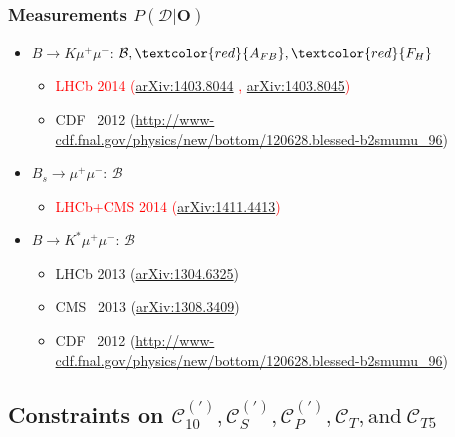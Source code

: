 \documentclass[english]{beamer}
\newcommand{\slide}[2][t]{\begin{frame}[#1] \frametitle{\insertsection} #2 \end{frame}}
\newcommand{\red}[1]{\textcolor{red}{#1}}
\begin{document}
\slide[c]{

    \frametitle{Measurements $ P\left(\mathcal{D} | \boldsymbol{O} \right) $}

    \begin{itemize}
        \item $B\rightarrow K\mu^+\mu^-$: $\mathcal{B} , \red{A_{FB}} , \red{F_H}$
        \begin{itemize}
            \item \red{LHCb 2014 {\tiny (\href{http://arXiv.org/abs/1403.8044}{arXiv:1403.8044} , \href{http://arXiv.org/abs/1403.8045}{arXiv:1403.8045})}}
            \item CDF~ 2012 {\tiny (\url{http://www-cdf.fnal.gov/physics/new/bottom/120628.blessed-b2smumu_96})}
        \end{itemize}

        \item $B_s\rightarrow\mu^+\mu^-$: $\mathcal{B}$

        \begin{itemize}
            \item \red{LHCb+CMS 2014 {\tiny({\href{http://arXiv.org/abs/1411.4413}{arXiv:1411.4413}})}}
        \end{itemize}

        \item $B\rightarrow K^\ast\mu^+\mu^-$: $\mathcal{B}$

        \begin{itemize}
            \item LHCb 2013 {\tiny({\href{http://arXiv.org/abs/1304.6325}{arXiv:1304.6325}})}
            \item CMS~ 2013 {\tiny({\href{http://arXiv.org/abs/1308.3409}{arXiv:1308.3409}})}
            \item CDF~ 2012 {\tiny (\url{http://www-cdf.fnal.gov/physics/new/bottom/120628.blessed-b2smumu_96})}
        \end{itemize}
    \end{itemize}

}

\subsection{Constraints on $\mathcal{C}_{10} ^{(\prime)} , \mathcal{C}_S ^{(\prime)} , \mathcal{C}_P ^{(\prime)} , \mathcal{C}_T , \text{and} ~ \mathcal{C}_{T5}$ }
\end{document}
